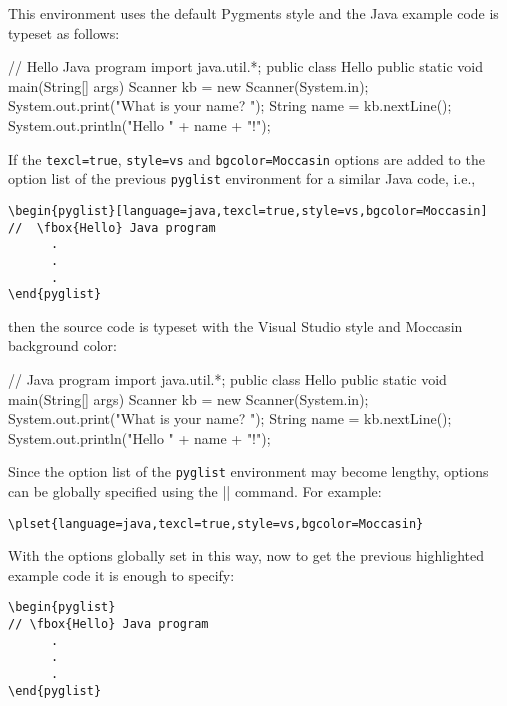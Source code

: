 \documentclass{article}
\begin{document}
This environment uses the default Pygments style and the Java example code is typeset as follows: 

\bigskip
\begin{pyglist}[language=java,fontsize=\MacroFont]
// Hello Java program
import java.util.*;
public class Hello {
   public static void main(String[] args) {
      Scanner kb = new Scanner(System.in);
      System.out.print("What is your name? ");
      String name = kb.nextLine();
      System.out.println("Hello " + name + "!");
   }
}
\end{pyglist}

If the \texttt{texcl=true}, \texttt{style=vs} and \texttt{bgcolor=Moccasin} options are added to the option list of the previous \texttt{pyglist} environment for a similar Java code, i.e.,

\begin{verbatim}
\begin{pyglist}[language=java,texcl=true,style=vs,bgcolor=Moccasin]
//  \fbox{Hello} Java program
      .
      .
      .
\end{pyglist}
\end{verbatim}

then the source code is typeset with the Visual Studio style and Moccasin background color:

\bigskip
\begin{pyglist}[language=java,texcl=true,style=vs,bgcolor=Moccasin,fontsize=\MacroFont]
//  Java program
import java.util.*;
public class Hello {
   public static void main(String[] args) {
      Scanner kb = new Scanner(System.in);
      System.out.print("What is your name? ");
      String name = kb.nextLine();
      System.out.println("Hello " + name + "!");
   }
}
\end{pyglist}

\bigskip
\DescribeMacro{\plset}
Since the option list of the \texttt{pyglist} environment may become lengthy, options can be globally specified using the |\plset| command. For example:

\begin{verbatim}
\plset{language=java,texcl=true,style=vs,bgcolor=Moccasin}
\end{verbatim}

With the options globally set in this way, now to get the previous highlighted example code it is enough to specify:

\begin{verbatim}
\begin{pyglist}
// \fbox{Hello} Java program
      .
      .
      .
\end{pyglist}
\end{verbatim}
\end{document}
